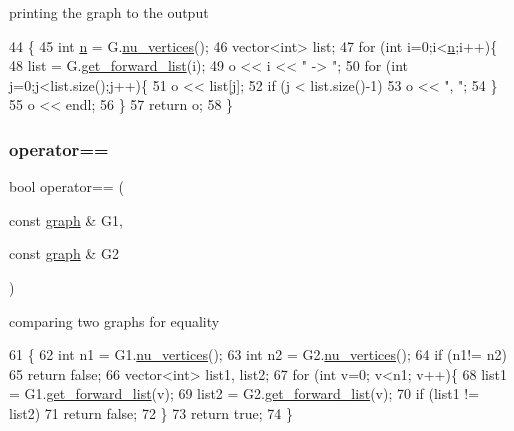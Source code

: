 printing the graph to the output 


\begin{DoxyCode}
44 \{
45   \textcolor{keywordtype}{int} \hyperlink{classgraph_ac8b3474ce95c04087c312508ec1443b6}{n} = G.\hyperlink{classgraph_a70a6e0e4e0a874ab122405abd38f83cd}{nu\_vertices}();
46   vector<int> list;
47   \textcolor{keywordflow}{for} (\textcolor{keywordtype}{int} i=0;i<\hyperlink{classgraph_ac8b3474ce95c04087c312508ec1443b6}{n};i++)\{
48     list = G.\hyperlink{classgraph_aa8fbee52a7b3604dbbd9175040c7ead5}{get\_forward\_list}(i);
49     o << i << \textcolor{stringliteral}{" -> "};
50     \textcolor{keywordflow}{for} (\textcolor{keywordtype}{int} j=0;j<list.size();j++)\{
51       o << list[j];
52       \textcolor{keywordflow}{if} (j < list.size()-1)
53         o << \textcolor{stringliteral}{", "};
54     \}
55     o << endl;
56   \}
57   \textcolor{keywordflow}{return} o;
58 \}
\end{DoxyCode}
\mbox{\label{classgraph_a156c8acaca113a7e5cc8d918dd1fc3f3}} 
\subsubsection{\texorpdfstring{operator==}{operator==}}
{\footnotesize\ttfamily bool operator== (\begin{DoxyParamCaption}\item[{const \hyperlink{classgraph}{graph} \&}]{G1,  }\item[{const \hyperlink{classgraph}{graph} \&}]{G2 }\end{DoxyParamCaption})\hspace{0.3cm}{\ttfamily [friend]}}



comparing two graphs for equality 


\begin{DoxyCode}
61 \{
62   \textcolor{keywordtype}{int} n1 = G1.\hyperlink{classgraph_a70a6e0e4e0a874ab122405abd38f83cd}{nu\_vertices}();
63   \textcolor{keywordtype}{int} n2 = G2.\hyperlink{classgraph_a70a6e0e4e0a874ab122405abd38f83cd}{nu\_vertices}();
64   \textcolor{keywordflow}{if} (n1!= n2)
65     \textcolor{keywordflow}{return} \textcolor{keyword}{false};
66   vector<int> list1, list2;
67   \textcolor{keywordflow}{for} (\textcolor{keywordtype}{int} v=0; v<n1; v++)\{
68     list1 = G1.\hyperlink{classgraph_aa8fbee52a7b3604dbbd9175040c7ead5}{get\_forward\_list}(v);
69     list2 = G2.\hyperlink{classgraph_aa8fbee52a7b3604dbbd9175040c7ead5}{get\_forward\_list}(v);
70     \textcolor{keywordflow}{if} (list1 != list2)
71       \textcolor{keywordflow}{return} \textcolor{keyword}{false};
72   \}
73   \textcolor{keywordflow}{return} \textcolor{keyword}{true};
74 \}
\end{DoxyCode}


